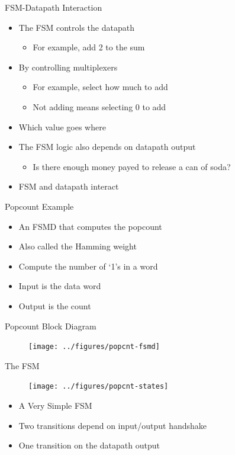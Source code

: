 \begin{frame}[fragile]{FSM-Datapath Interaction}
\begin{itemize}
\item The FSM controls the datapath
\begin{itemize}
\item For example, add 2 to the sum
\end{itemize}
\item By controlling multiplexers
\begin{itemize}
\item For example, select how much to add
\item Not adding means selecting 0 to add
\end{itemize}
\item Which value goes where
\item The FSM logic also depends on datapath output
\begin{itemize}
\item Is there enough money payed to release a can of soda?
\end{itemize}
\item FSM and datapath interact
\end{itemize}
\end{frame}


\begin{frame}[fragile]{Popcount Example}
\begin{itemize}
\item An FSMD that computes the popcount
\item Also called the Hamming weight
\item Compute the number of `1's in a word
\item Input is the data word
\item Output is the count
\end{itemize}
\end{frame}

\begin{frame}[fragile]{Popcount Block Diagram}

\begin{figure}
  \texttt{[image: ../figures/popcnt-fsmd]}
\end{figure}
\end{frame}


\begin{frame}[fragile]{The FSM}
\begin{figure}
  \texttt{[image: ../figures/popcnt-states]}
\end{figure}
\begin{itemize}
\item A Very Simple FSM
\item Two transitions depend on input/output handshake
\item One transition on the datapath output
\end{itemize}
\end{frame}

